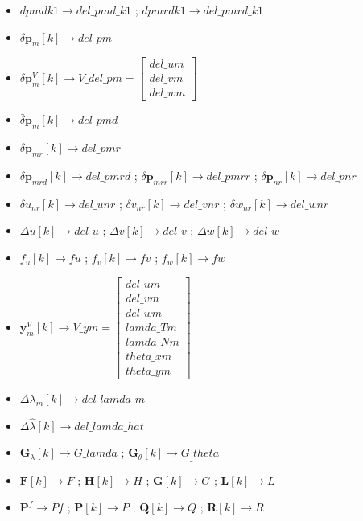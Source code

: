 \documentclass[UTF8,12pt,a4paper]{ctexart}
\begin{document}
\begin{itemize}[itemsep=6pt]

\item $dpmdk1 \to del\_pmd\_k1$ \;;\; $dpmrdk1 \to del\_pmrd\_k1$

\item $\delta\mathbf{p}_m[k] \to del\_pm$

\item $\delta\mathbf{p}_m^V[k] \to V\_del\_pm = \begin{bmatrix} del\_um \\ del\_vm \\ del\_wm \end{bmatrix}$

\item $\bar{\delta}\mathbf{p}_m[k] \to del\_pmd$

\item $\delta\mathbf{p}_{mr}[k] \to del\_pmr$

\item $\delta\mathbf{p}_{mrd}[k] \to del\_pmrd$ \;;\;
$\delta\mathbf{p}_{mrr}[k] \to del\_pmrr$ \;;\;
$\delta\mathbf{p}_{nr}[k] \to del\_pnr$

\item $\delta u_{nr}[k] \to del\_unr$ \;;\;
$\delta v_{nr}[k] \to del\_vnr$ \;;\;
$\delta w_{nr}[k] \to del\_wnr$

\item $\Delta u[k] \to del\_u$ \;;\;
$\Delta v[k] \to del\_v$ \;;\;
$\Delta w[k] \to del\_w$

\item $f_u[k] \to fu$ \;;\;
$f_v[k] \to fv$ \;;\;
$f_w[k] \to fw$

\item $\mathbf{y}_m^V[k] \to V\_ym = \begin{bmatrix} del\_um \\ del\_vm \\ del\_wm \\ lamda\_Tm \\ lamda\_Nm \\ theta\_xm \\ theta\_ym \end{bmatrix}$

\item $\Delta\lambda_m[k] \to del\_lamda\_m$

\item $\Delta\hat{\lambda}[k] \to del\_lamda\_hat$

\item $\mathbf{G}_\lambda[k] \to G\_lamda$ \;;\;
$\mathbf{G}_\theta[k] \to G_\_theta$

\item $\mathbf{F}[k] \to F$ \;;\;
$\mathbf{H}[k] \to H$ \;;\;
$\mathbf{G}[k] \to G$ \;;\;
$\mathbf{L}[k] \to L$

\item $\mathbf{P}^f \to Pf$ \;;\;
$\mathbf{P}[k] \to P$ \;;\;
$\mathbf{Q}[k] \to Q$ \;;\;
$\mathbf{R}[k] \to R$

\end{itemize}
\end{document}
